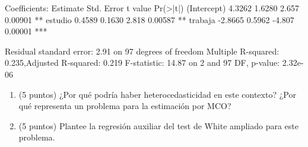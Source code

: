 \documentclass[10pt,a4paper]{article}
\begin{document}
\begin{enumerate}
{\begin{minipage}{0.95\textwidth}
Coefficients:\newline
\hspace*{1em}Estimate \hspace{1em} Std. Error \hspace{1em} t value \hspace{1em} Pr(>|t|)\newline
(Intercept) \hspace{0.6em} 4.3262 \hspace{2em} 1.6280 \hspace{2em} 2.657 \hspace{2em} 0.00901 **\newline
estudio \hspace{2.3em} 0.4589 \hspace{2em} 0.1630 \hspace{2em} 2.818 \hspace{2em} 0.00587 **\newline
trabaja \hspace{2.3em} -2.8665 \hspace{1.9em} 0.5962 \hspace{2em} -4.807 \hspace{1.7em} 0.00001 ***\newline

Residual standard error: 2.91 on 97 degrees of freedom\newline
Multiple R-squared: 0.235,\quad Adjusted R-squared: 0.219\newline
F-statistic: 14.87 on 2 and 97 DF, \quad p-value: 2.32e-06
\end{minipage}
}


\begin{enumerate}
    \item (5 puntos) ¿Por qué podría haber heterocedasticidad en este contexto? ¿Por qué representa un problema para la estimación por MCO?\\


    \item (5 puntos) Plantee la regresión auxiliar del test de White ampliado para este problema.\\


\end{enumerate}
\end{enumerate}
\end{document}
